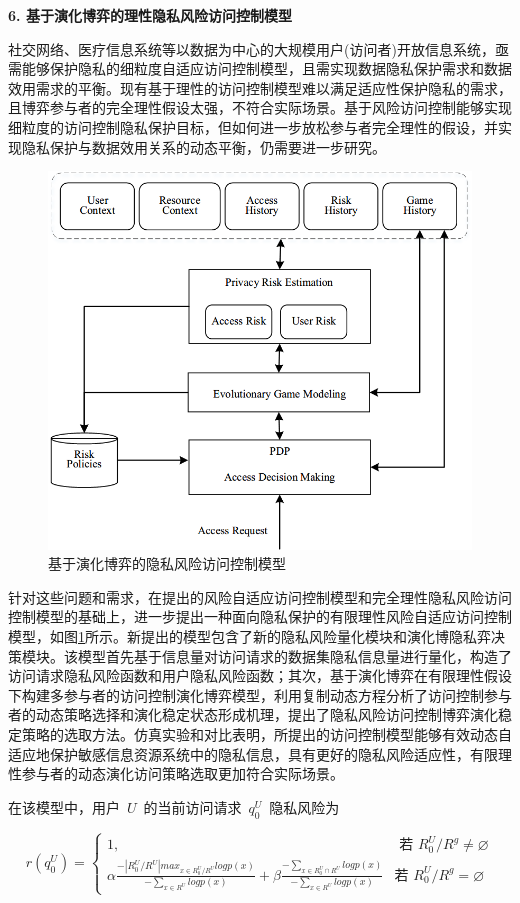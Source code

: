 \documentclass[pdftex,notypeinfo,twoside,openany,UTF8,fntef]{CASthesis}
\theoremstyle{THrm}{
	\newtheorem{question}{Question}[section]
	\newtheorem{property}{性质}[section]
	\newtheorem{assumption}{假设}[section]
	\newtheorem{claim}[lemma]{断言}
	
}
\begin{document}
\textbf{6.	基于演化博弈的理性隐私风险访问控制模型}

社交网络、医疗信息系统等以数据为中心的大规模用户(访问者)开放信息系统，亟需能够保护隐私的细粒度自适应访问控制模型，且需实现数据隐私保护需求和数据效用需求的平衡。现有基于理性的访问控制模型难以满足适应性保护隐私的需求，且博弈参与者的完全理性假设太强，不符合实际场景。基于风险访问控制能够实现细粒度的访问控制隐私保护目标，但如何进一步放松参与者完全理性的假设，并实现隐私保护与数据效用关系的动态平衡，仍需要进一步研究。

\begin{figure}[htbp]
	\centering
	\includegraphics[width = 0.6\linewidth]{./figures/Evolutionary-game-Rabac.png}
	\caption{基于演化博弈的隐私风险访问控制模型}
	\label{fig:Evolutionary-game-Rabac}
\end{figure}

针对这些问题和需求，在提出的风险自适应访问控制模型和完全理性隐私风险访问控制模型的基础上，进一步提出一种面向隐私保护的有限理性风险自适应访问控制模型，如图\ref{fig:Evolutionary-game-Rabac}所示。新提出的模型包含了新的隐私风险量化模块和演化博隐私弈决策模块。该模型首先基于信息量对访问请求的数据集隐私信息量进行量化，构造了访问请求隐私风险函数和用户隐私风险函数；其次，基于演化博弈在有限理性假设下构建多参与者的访问控制演化博弈模型，利用复制动态方程分析了访问控制参与者的动态策略选择和演化稳定状态形成机理，提出了隐私风险访问控制博弈演化稳定策略的选取方法。仿真实验和对比表明，所提出的访问控制模型能够有效动态自适应地保护敏感信息资源系统中的隐私信息，具有更好的隐私风险适应性，有限理性参与者的动态演化访问策略选取更加符合实际场景。

在该模型中，用户~$U$~的当前访问请求~$q_{0}^{U}$~隐私风险为

\begin{equation}
r(q_{0}^{U})=\begin{cases}
1, & \text{ 若 } R_{0}^{U}/{{R}^{g}}\ne \varnothing \\ 
\alpha \frac{-|R_{0}^{U}/{R}^{U}|max_{x\in R_{0}^{U}/{R}^{U}}logp(x)}{-\sum_{x\in{R^U}}logp(x)}+ \beta \frac{-\sum_{x\in R_0^U \cap  R^U}logp(x)}{-\sum_{x\in  R^U}logp(x)}& \text{若 } R_{0}^{U}/{{R}^{g}}=\varnothing 
\end{cases}
\end{equation}
\end{document}
